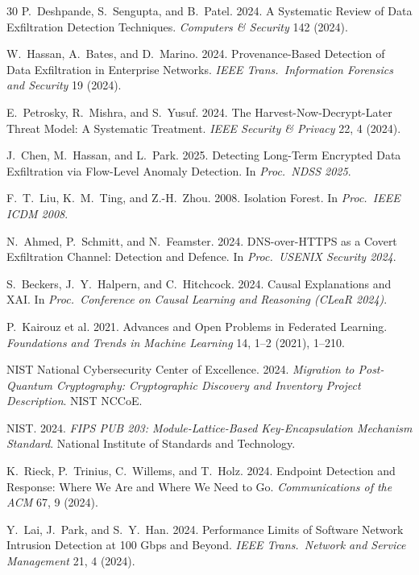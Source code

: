 \documentclass[sigconf,nonacm]{acmart}
\begin{document}
\begin{thebibliography}{30}
P.~Deshpande, S.~Sengupta, and B.~Patel. 2024. A Systematic Review
of Data Exfiltration Detection Techniques. \textit{Computers \&
Security} 142 (2024).

W.~Hassan, A.~Bates, and D.~Marino. 2024. Provenance-Based Detection
of Data Exfiltration in Enterprise Networks. \textit{IEEE Trans.\
Information Forensics and Security} 19 (2024).

E.~Petrosky, R.~Mishra, and S.~Yusuf. 2024. The Harvest-Now-Decrypt-Later
Threat Model: A Systematic Treatment.
\textit{IEEE Security \& Privacy} 22, 4 (2024).

J.~Chen, M.~Hassan, and L.~Park. 2025. Detecting Long-Term Encrypted
Data Exfiltration via Flow-Level Anomaly Detection.
In \textit{Proc.\ NDSS 2025}.

F.~T.~Liu, K.~M.~Ting, and Z.-H.~Zhou. 2008. Isolation Forest. In
\textit{Proc.\ IEEE ICDM 2008}.

N.~Ahmed, P.~Schmitt, and N.~Feamster. 2024. DNS-over-HTTPS as a
Covert Exfiltration Channel: Detection and Defence.
In \textit{Proc.\ USENIX Security 2024}.

S.~Beckers, J.~Y.~Halpern, and C.~Hitchcock. 2024. Causal Explanations
and XAI. In \textit{Proc.\ Conference on Causal Learning and
Reasoning (CLeaR 2024)}.

P.~Kairouz et al. 2021. Advances and Open Problems in Federated
Learning. \textit{Foundations and Trends in Machine Learning} 14, 1--2
(2021), 1--210.

NIST National Cybersecurity Center of Excellence. 2024.
\textit{Migration to Post-Quantum Cryptography: Cryptographic Discovery
and Inventory Project Description}. NIST NCCoE.

NIST. 2024. \textit{FIPS PUB 203: Module-Lattice-Based Key-Encapsulation
Mechanism Standard}. National Institute of Standards and Technology.

K.~Rieck, P.~Trinius, C.~Willems, and T.~Holz. 2024. Endpoint
Detection and Response: Where We Are and Where We Need to Go.
\textit{Communications of the ACM} 67, 9 (2024).

Y.~Lai, J.~Park, and S.~Y.~Han. 2024. Performance Limits of Software
Network Intrusion Detection at 100 Gbps and Beyond. \textit{IEEE
Trans.\ Network and Service Management} 21, 4 (2024).


\end{thebibliography}
\end{document}
